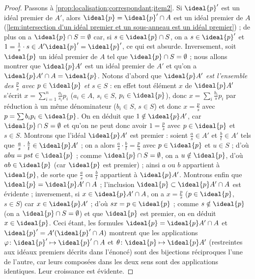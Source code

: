 \documentclass[11pt, %
  title in boldface,
  theorem in new line,
  theorem numbering = section,
  number theorems separately,
  simple name,
]{beaulivre}
\begin{document}
\begin{proof}
        Passons à \ref{prop:localisation;correspondant;item2}. Si \( \ideal{p}' \) est un idéal premier de \( A' \), alors \( \ideal{p} = \ideal{p}' \cap A \) est un idéal premier de \( A \) (\cref{lem:intersection d'un idéal premier et un sous-anneau est un idéal premier}) ; de plus on a \( \ideal{p} \cap S = \emptyset \) car, si \( s \in \ideal{p} \cap S \), on a \( s \in \ideal{p}' \) et \( 1 = \frac{1}{s} \cdot s \in A' \ideal{p}' = \ideal{p}' \), ce qui est absurde. Inversement, soit \( \ideal{p} \) un idéal premier de \( A \) tel que \( \ideal{p} \cap S = \emptyset \) ; nous allons montrer que \( \ideal{p} A' \) est un idéal premier de \( A' \) et qu'on a \( \ideal{p} A' \cap A = \ideal{p} \). Notons d'abord que \emph{\( \ideal{p} A' \) est l'ensemble des \( \frac{p}{s} \) avec \( p \in \ideal{p} \) et \( s \in S \)} : en effet tout élément \( x \) de \( \ideal{p} A' \) s'écrit \( x = \sum_{i=1}^n \frac{a_i}{s_i}p_i \) (\( a_i \in A \), \( s_i \in S \), \( p_i \in \ideal{p} \)), donc \( x = \sum_i \frac{b_i}{s} p_i \) par réduction à un même dénominateur (\( b_i \in S \), \( s \in S \)) et donc \( x = \frac{p}{s} \) avec \( p = \sum b_i p_i \in \ideal{p} \). On en déduit que \( 1 \notin \ideal{p} A' \), car \( \ideal{p} \cap S = \emptyset \) et qu'on ne peut donc avoir \( 1 = \frac{p}{s} \) avec \( p \in \ideal{p} \) et \( s \in S \). Montrons que l'idéal \( \ideal{p} A' \) est premier : soient \( \frac{a}{s} \in A' \) et \( \frac{b}{t} \in A' \) tels que \( \frac{a}{s} \cdot \frac{b}{t} \in \ideal{p} A' \) ; on a alors \( \frac{a}{s} \cdot \frac{b}{t} = \frac{p}{u} \) avec \( p \in \ideal{p} \) et \( u \in S \) ; d'où \( abu = pst \in \ideal{p} \) ; comme \( \ideal{p} \cap S = \emptyset \), on a \( u \notin \ideal{p} \), d'où \( ab \in \ideal{p} \) (car \( \ideal{p} \) est premier) ; ainsi \( a \) ou \( b \) appartient à \( \ideal{p} \), de sorte que \( \frac{a}{s} \) ou \( \frac{b}{t} \) appartient à \( \ideal{p} A' \). Montrons enfin que \( \ideal{p} = \ideal{p} A' \cap A \) ; l'inclusion \( \ideal{p} \subset \ideal{p} A' \cap A \) est évidente ; inversement, si \( x \in \ideal{p} A' \cap A \), on a \( x = \frac{p}{s} \) (\( p \in \ideal{p} \), \( s \in S \)) car \( x \in \ideal{p} A' \) ; d'où \( sx = p \in \ideal{p} \) ; comme \( s \notin \ideal{p} \) (on a \( \ideal{p} \cap S = \emptyset \)) et que \( \ideal{p} \) est premier, on en déduit \( x \in \ideal{p} \). Ceci étant, les formules \( \ideal{p} = \ideal{p} A' \cap A \) et \( \ideal{p}' = A'(\ideal{p}' \cap A) \) montrent que les applications \( \varphi \colon \ideal{p}' \mapsto \ideal{p}' \cap A \) et \( \theta \colon \ideal{p} \mapsto \ideal{p} A' \) (restreintes aux idéaux premiers décrits dans l'énoncé) sont des bijections réciproques l'une de l'autre, car leurs composées dans les deux sens sont des applications identiques. Leur croissance est évidente.
    \end{proof}
\end{document}
